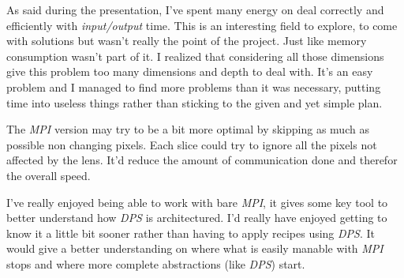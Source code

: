 \documentclass[10pt,a4paper]{article}
\begin{document}
As said during the presentation, I've spent many energy on deal correctly and
efficiently with \emph{input/output} time. This is an interesting field to
explore, to come with solutions but wasn't really the point of the project.
Just like memory consumption wasn't part of it. I realized that considering
all those dimensions give this problem too many dimensions and depth to deal
with. It's an easy problem and I managed to find more problems than it was
necessary, putting time into useless things rather than sticking to the given
and yet simple plan.

The \emph{MPI} version may try to be a bit more optimal by skipping as much as
possible non changing pixels. Each slice could try to ignore all the pixels not
affected by the lens. It'd reduce the amount of communication done and
therefor the overall speed.

I've really enjoyed being able to work with bare \emph{MPI}, it gives some key
tool to better understand how \emph{DPS} is architectured. I'd really have
enjoyed getting to know it a little bit sooner rather than having to apply
recipes using \emph{DPS}. It would give a better understanding on where what
is easily manable with \emph{MPI} stops and where more complete abstractions
(like \emph{DPS}) start.
\end{document}
